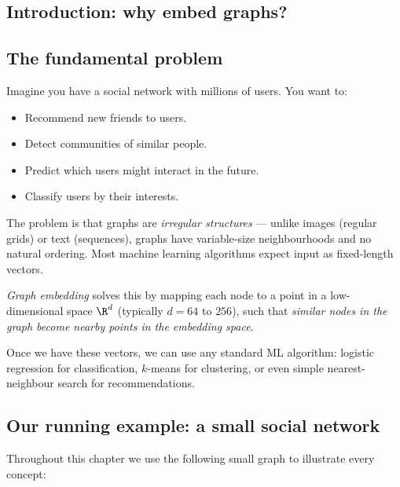 \begin{notechapter}
\section{Introduction: why embed graphs?}

\subsection{The fundamental problem}

Imagine you have a social network with millions of users. You want to:
\begin{itemize}
    \item Recommend new friends to users.
    \item Detect communities of similar people.
    \item Predict which users might interact in the future.
    \item Classify users by their interests.
\end{itemize}

The problem is that graphs are \emph{irregular structures} --- unlike images (regular grids) or text (sequences), graphs have variable-size neighbourhoods and no natural ordering. Most machine learning algorithms expect input as fixed-length vectors.

\begin{keyidea}
\emph{Graph embedding} solves this by mapping each node to a point in a low-dimensional space $\R^d$ (typically $d = 64$ to $256$), such that \emph{similar nodes in the graph become nearby points in the embedding space}.

Once we have these vectors, we can use any standard ML algorithm: logistic regression for classification, $k$-means for clustering, or even simple nearest-neighbour search for recommendations.
\end{keyidea}

\subsection{Our running example: a small social network}

Throughout this chapter we use the following small graph to illustrate every concept:

\begin{figure}[htbp]
\centering
{}
\end{figure}
\end{notechapter}
